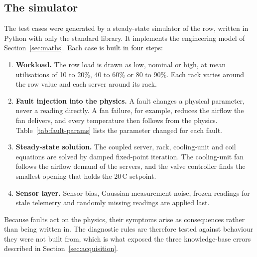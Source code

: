 \subsection{The simulator}

The test cases were generated by a steady-state simulator of the row, written in Python with only the standard library. It implements the engineering model of Section~\ref{sec:maths}. Each case is built in four steps:

\begin{enumerate}
  \item \textbf{Workload.} The row load is drawn as low, nominal or high, at mean utilisations of 10 to 20\%, 40 to 60\% or 80 to 90\%. Each rack varies around the row value and each server around its rack.
  \item \textbf{Fault injection into the physics.} A fault changes a physical parameter, never a reading directly. A fan failure, for example, reduces the airflow the fan delivers, and every temperature then follows from the physics. Table~\ref{tab:fault-params} lists the parameter changed for each fault.
  \item \textbf{Steady-state solution.} The coupled server, rack, cooling-unit and coil equations are solved by damped fixed-point iteration. The cooling-unit fan follows the airflow demand of the servers, and the valve controller finds the smallest opening that holds the 20\,\textdegree C setpoint.
  \item \textbf{Sensor layer.} Sensor bias, Gaussian measurement noise, frozen readings for stale telemetry and randomly missing readings are applied last.
\end{enumerate}

Because faults act on the physics, their symptoms arise as consequences rather than being written in. The diagnostic rules are therefore tested against behaviour they were not built from, which is what exposed the three knowledge-base errors described in Section~\ref{sec:acquisition}.

